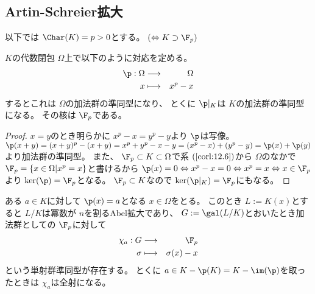 \documentclass[../master_galois_theory]{subfiles}
\begin{document}
\subsection{Artin-Schreier拡大}

以下では
$\Char(K) = p > 0$とする。 $(\Leftrightarrow K \supset \F_p)$

\begin{prop}
  $K$の代数閉包 $\Omega$上で以下のように対応を定める。
  \begin{eqnarray*}
    \p : \Omega & \longrightarrow & \Omega \\
    x & \longmapsto & x^p - x
  \end{eqnarray*}
  するとこれは $\Omega$の加法群の準同型になり、
  とくに $\p|_K$は $K$の加法群の準同型になる。
  その核は $\F_p$である。
\end{prop}

\begin{proof}
  $x = y$のとき明らかに $x^p - x = y^p - y$より $\p$は写像。
  $\p(x + y) = (x + y)^p - (x + y) = x^p + y^p -x -y = (x^p - x) + (y^p - y) = \p(x) + \p(y)$より加法群の準同型。
  また、 $\F_p \subset K \subset \Omega$で系 $(\mathrm{\ref{corl:12.6}})$から
  $\Omega$のなかで $\F_p = \{ x \in \Omega | x^p = x \}$と書けるから
  $\p(x) = 0 \Leftrightarrow x^p - x = 0 \Leftrightarrow x^p = x \Leftrightarrow x \in \F_p$より $\ker(\p) = \F_p$となる。
  $\F_p \subset K$なので $\ker(\p|_K) = \F_p$にもなる。
\end{proof}

\begin{prop}
  ある $a \in K$に対して $\p(x) = a$となる $x \in \Omega$をとる。
  このとき $L := K(x)$とすると $L/K$は冪数が $n$を割る\rm{Abel}拡大であり、
  $G := \gal(L/K)$とおいたとき加法群としての $\F_p$に対して
  \begin{eqnarray*}
    \chi_a : G & \longrightarrow & \F_p \\
    \sigma & \longmapsto & \sigma(x) - x
  \end{eqnarray*}
  という単射群準同型が存在する。
  とくに $a \in K - \p(K) = K - \im(\p)$を取ったときは
  $\chi_a$は全射になる。
\end{prop}
\end{document}
